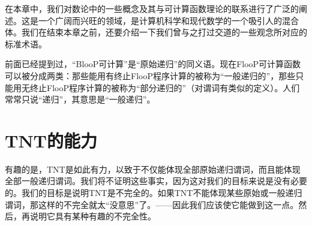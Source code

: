 在本章中，我们对数论中的一些概念及其与可计算函数理论的联系进行了广泛的阐述。这是一个广阔而兴旺的领域，是计算机科学和现代数学的一个吸引人的混合体。我们在结束本章之前，还要介绍一下我们曾与之打过交道的一些观念所对应的标准术语。

前面已经提到过，“BlooP可计算”是“原始递归”的同义语。现在FlooP可计算函数可以被分成两类：那些能用有终止FlooP程序计算的被称为“一般递归的”，那些只能用无终止FlooP程序计算的被称为“部分递归的”（对谓词有类似的定义）。人们常常只说“递归”，其意思是“一般递归”。

\section{TNT的能力}

有趣的是，TNT是如此有力，以致于不仅能体现全部原始递归谓词，而且能体现全部一般递归谓词。我们将不证明这些事实，因为这对我们的目标来说是没有必要的。我们的目标是说明TNT是不完全的。如果TNT不能体现某些原始或一般递归谓词，那这样的不完全就太“没意思”了。——因此我们应该使它能做到这一点。然后，再说明它具有某种有趣的不完全性。
